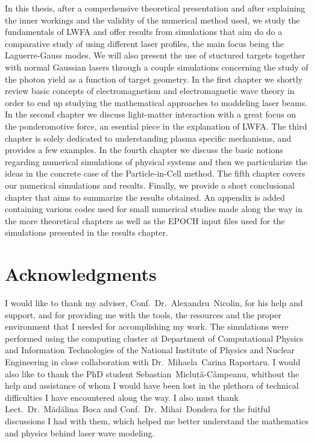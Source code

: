 \documentclass[12pt, class=report, crop=false]{standalone}
\begin{document}
In this thesis, after a comperhensive theoretical presentation and after explaining the inner workings and the validity of the numerical method used, we study the fundamentals of LWFA and offer results from simulations that aim do do a comparative study of using different laser profiles, the main focus being the Laguerre-Gauss modes. We will also present the use of stuctured targets together with normal Gaussian lasers through a couple simulations concerning the study of the photon yield as a function of target geometry. In the first chapter we shortly review basic concepts of electromagnetism and electromagnetic wave theory in order to end up studying the mathematical approaches to moddeling laser beams. In the second chapter we discuss light-matter interaction with a great focus on the ponderomotive force, an esential piece in the explanation of LWFA. The third chapter is solely dedicated to understanding plasma specific mechanisms, and provides a few examples. In the fourth chapter we discuss the basic notions regarding numerical simulations of physical systems and then we particularize the ideas in the concrete case of the Particle-in-Cell method. The fifth chapter covers our numerical simulations and results. Finally, we provide a short conclusional chapter that aims to summarize the results obtained. An appendix is added containing various codes used for small numerical studies made along the way in the more theoretical chapters as well as the EPOCH input files used for the simulations presented in the results chapter.

\section*{Acknowledgments}
I would like to thank my adviser, Conf.~Dr.~Alexandru~Nicolin, for his help and support, and for providing me with the tools, the resources and the proper environment that I needed for accomplishing my work. The simulations were performed using the computing cluster at Department of Computational Physics and Information Technologies of the National Institute of Physics and Nuclear Engineering in close collaboration with Dr.~Mihaela~Carina Raportaru. I would also like to thank the PhD student Sebastian~Micluță-Câmpeanu, whithout the help and assistance of whom I would have been lost in the plethora of technical difficulties I have encountered along the way. I also must thank Lect.~Dr.~Mădălina~Boca  and Conf.~Dr.~Mihai~Dondera for the fuitful discussions I had with them, which helped me better understand the mathematics and physics behind laser wave modeling.
\end{document}
